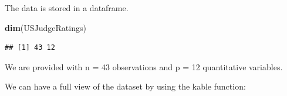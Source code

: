 \documentclass[]{article}
\newenvironment{Shaded}{\begin{snugshade}}{\end{snugshade}}
\newcommand{\DataTypeTok}[1]{\textcolor[rgb]{0.13,0.29,0.53}{#1}}
\newcommand{\DecValTok}[1]{\textcolor[rgb]{0.00,0.00,0.81}{#1}}
\newcommand{\KeywordTok}[1]{\textcolor[rgb]{0.13,0.29,0.53}{\textbf{#1}}}
\newcommand{\NormalTok}[1]{#1}
\newcommand{\OperatorTok}[1]{\textcolor[rgb]{0.81,0.36,0.00}{\textbf{#1}}}
\newcommand{\StringTok}[1]{\textcolor[rgb]{0.31,0.60,0.02}{#1}}
\begin{document}
The data is stored in a dataframe.

\begin{Shaded}
\begin{Highlighting}[]
\KeywordTok{dim}\NormalTok{(USJudgeRatings)}
\end{Highlighting}
\end{Shaded}

\begin{verbatim}
## [1] 43 12
\end{verbatim}

We are provided with n = 43 observations and p = 12 quantitative
variables.

We can have a full view of the dataset by using the kable function:

\begin{Shaded}
\end{Shaded}
\end{document}

